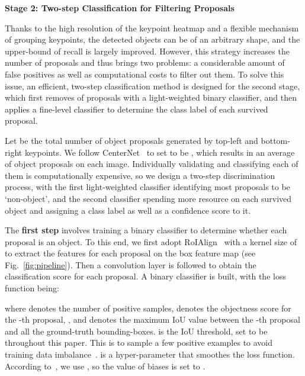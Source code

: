 \documentclass[runningheads]{llncs}
\begin{document}
\noindent\quad\textbf{Stage 2: Two-step Classification for Filtering Proposals}

Thanks to the high resolution of the keypoint heatmap and a flexible mechanism of grouping keypoints, the detected objects can be of an arbitrary shape, and the upper-bound of recall is largely improved. However, this strategy increases the number of proposals and thus brings two problems: a considerable amount of false positives as well as computational costs to filter out them. To solve this issue, an efficient, two-step classification method is designed for the second stage, which first removes  of proposals with a light-weighted binary classifier, and then applies a fine-level classifier to determine the class label of each survived proposal.

Let  be the total number of object proposals generated by  top-left and  bottom-right keypoints. We follow CenterNet~\cite{duan2019centernet} to set  to be , which results in an average of  object proposals on each image. Individually validating and classifying each of them is computationally expensive, so we design a two-step discrimination process, with the first light-weighted classifier identifying most proposals to be `non-object', and the second classifier spending more resource on each survived object and assigning a class label as well as a confidence score to it.

The \textbf{first step} involves training a binary classifier to determine whether each proposal is an object. To this end, we first adopt RoIAlign~\cite{he2017mask} with a kernel size of  to extract the features for each proposal on the box feature map (see Fig.~\ref{fig:pipeline}). Then a  convolution layer is followed to obtain the classification score for each proposal. A binary classifier is built, with the loss function being:

where  denotes the number of positive samples,  denotes the objectness score for the -th proposal, , and  denotes the maximum IoU value between the -th proposal and all the ground-truth bounding-boxes.  is the IoU threshold, set to be  throughout this paper. This is to sample a few positive examples to avoid training data imbalance~\cite{lin2017focal}.  is a hyper-parameter that smoothes the loss function. According to~\cite{lin2017focal}, we use , so the value of biases is set to .
\end{document}
